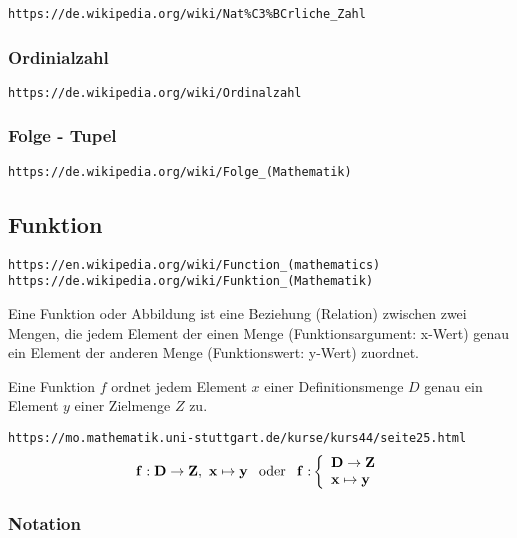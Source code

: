 \documentclass[10pt,a4paper]{article}
\begin{document}
\verb+https://de.wikipedia.org/wiki/Nat%C3%BCrliche_Zahl+

\subsubsection{Ordinialzahl}

\verb+https://de.wikipedia.org/wiki/Ordinalzahl+

\subsubsection{Folge - Tupel}

\verb+https://de.wikipedia.org/wiki/Folge_(Mathematik)+


\subsection {Funktion}

\verb+https://en.wikipedia.org/wiki/Function_(mathematics)+ \\
\verb+https://de.wikipedia.org/wiki/Funktion_(Mathematik)+
\vskip 8pt

Eine Funktion oder Abbildung ist eine Beziehung (Relation) zwischen zwei Mengen,
die jedem Element der einen Menge (Funktionsargument: x-Wert) genau ein Element
der anderen Menge (Funktionswert: y-Wert) zuordnet.

\vskip 8pt
Eine Funktion $f$ ordnet jedem Element $x$ einer Definitionsmenge $D$ genau ein
Element $y$ einer Zielmenge $Z$ zu.

\vskip 8pt
\verb+https://mo.mathematik.uni-stuttgart.de/kurse/kurs44/seite25.html+
\vskip 8pt
  \[
  {\bf f: D \rightarrow Z,\ x \mapsto y \hskip 8pt} {\rm oder} \hskip 8pt {\bf f:}
  \left\{%
    \begin{array}{ll}
      {\bf D \rightarrow Z} \\
      {\bf x \mapsto y}
    \end{array}
  \right.
  \]

    
\subsubsection {Notation}
\end{document}
